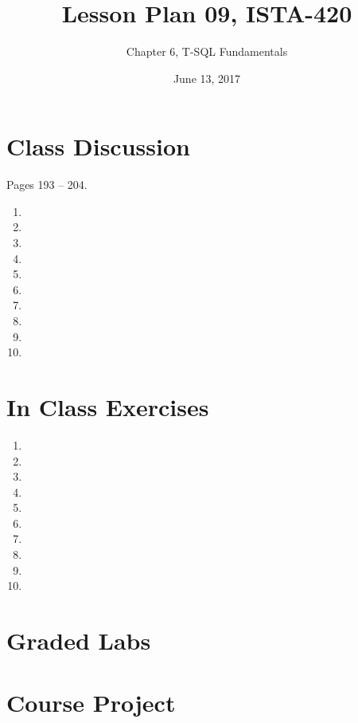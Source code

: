 \documentclass{article}
\title{Lesson Plan 09, ISTA-420}
\author{Chapter 6, T-SQL Fundamentals}
\date{June 13, 2017}
\begin{document}
    

    \maketitle{}

    \section{Class Discussion}

    Pages 193 -- 204.

    \begin{enumerate}
        \item 
        \item 
        \item 
        \item 
        \item 
        \item 
        \item 
        \item 
        \item 
        \item 
    \end{enumerate}

    \section{In Class Exercises}

    \begin{enumerate}
        \item 
        \item 
        \item 
        \item 
        \item 
        \item 
        \item 
        \item 
        \item 
        \item 
    \end{enumerate}

    \section{Graded Labs}



    \section{Course Project}
\end{document}
